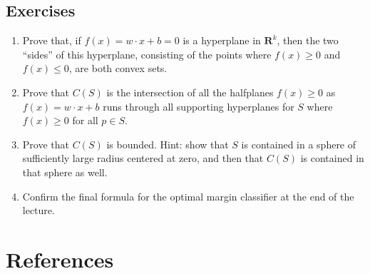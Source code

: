 \documentclass[
]{article}
\begin{document}
\hypertarget{sec:exercises}{%
\subsection{Exercises}\label{sec:exercises}}

\begin{enumerate}
\def\labelenumi{\arabic{enumi}.}
\item
  Prove that, if \(f(x)=w\cdot x+b=0\) is a hyperplane in
  \(\mathbf{R}^{k}\), then the two ``sides'' of this hyperplane,
  consisting of the points where \(f(x)\ge 0\) and \(f(x)\le 0\), are
  both convex sets.
\item
  Prove that \(C(S)\) is the intersection of all the halfplanes
  \(f(x)\ge 0\) as \(f(x)=w\cdot x+b\) runs through all supporting
  hyperplanes for \(S\) where \(f(x)\ge 0\) for all \(p\in S\).
\item
  Prove that \(C(S)\) is bounded. Hint: show that \(S\) is contained in
  a sphere of sufficiently large radius centered at zero, and then that
  \(C(S)\) is contained in that sphere as well.
\item
  Confirm the final formula for the optimal margin classifier at the end
  of the lecture.
\end{enumerate}

\hypertarget{bibliography}{%
\section*{References}\label{bibliography}}
\end{document}
